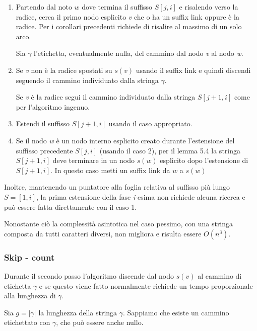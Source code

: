 \begin{enumerate}
	\item Partendo dal noto $ w $ dove termina il suffisso $ S[j,i] $ e risalendo verso la radice, cerca il primo nodo esplicito \textit{v} che o ha un suffix link oppure è la radice. Per i corollari precedenti richiede di risalire al massimo di un solo arco.
	
	Sia $\gamma$ l'etichetta, eventualmente nulla, del cammino dal nodo \textit{v} al nodo \textit{w}.
	
	\item Se \textit{v} non è la radice spostati su  $s(v)$ usando il suffix link e quindi discendi seguendo il cammino individuato dalla stringa $ \gamma $.
	
	Se \textit{v} è la radice segui il cammino individuato dalla stringa $ S[j+1,i] $ come per l'algoritmo ingenuo.
	
	\item Estendi il suffisso $ S[j+1,i] $ usando il caso appropriato.
	
	\item Se il nodo \textit{w} è un nodo interno esplicito creato durante l'estensione del suffisso precedente $S[j,i]$ (usando il caso 2), per il lemma 5.4 la stringa $ S[j+1,i] $ deve terminare in un nodo $ s(w) $ esplicito dopo l'estensione di $ S[j+1,i] $. In questo caso metti un suffix link da $ w $ a $ s(w) $
\end{enumerate}

Inoltre, mantenendo un puntatore alla foglia relativa al suffisso più lungo $ S=[1,i] $, la prima estensione della fase \textit{i}-esima non richiede alcuna ricerca e può essere fatta direttamente con il caso 1.

Nonostante ciò la complessità asintotica nel caso pessimo, con una stringa composta da tutti caratteri diversi, non migliora e risulta essere $ O(n^3) $.

\subsubsection{Skip - count}

Durante il secondo passo l'algoritmo discende dal nodo $s(v)$ al cammino di etichetta $\gamma$ e se questo viene fatto normalmente richiede un tempo proporzionale alla lunghezza di $\gamma$.

Sia $g = |\gamma|$ la lunghezza della stringa $\gamma$. Sappiamo che esiste un cammino etichettato con $\gamma$, che può essere anche nullo.

